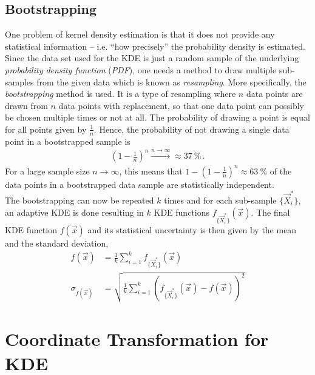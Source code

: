 \subsection{Bootstrapping}\label{sec:bootstrapping}

One problem of kernel density estimation is that it does not provide any statistical information -- i.e. \enquote{how precisely} the probability density is estimated. Since the data set used for the KDE is just a random sample of the underlying \textit{probability density function} (\textit{PDF}), one needs a method to draw multiple sub-samples from the given data which is known as \textit{resampling}. More specifically, the \textit{bootstrapping} method is used. It is a type of resampling where $n$ data points are drawn from $n$ data points with replacement, so that one data point can possibly be chosen multiple times or not at all. The probability of drawing a point is equal for all points given by $\frac{1}{n}$. Hence, the probability of not drawing a single data point in a bootstrapped sample is
\begin{align}
	\left(1-\frac{1}{n}\right)^n \overset{n\to\infty}{\longrightarrow} \approx\SI{37}{\percent}\,.
\end{align}
For a large sample size $n\to\infty$, this means that $1-\left(1-\frac{1}{n}\right)^n\approx\SI{63}{\percent}$ of the data points in a bootstrapped data sample are statistically independent.\\
\newpage
The bootstrapping can now be repeated $k$ times and for each sub-sample $\{\vec{X}_i^\ast\}$, an adaptive KDE is done resulting in $k$ KDE functions $f_{\{\vec{X}_i^\ast\}}(\vec{x})$. The final KDE function $f(\vec{x})$ and its statistical uncertainty is then given by the mean and the standard deviation,~\cite{kde:bootstrapping,kde:schoenen}
\begin{subequations}
	\begin{align}
		f(\vec{x}) &= \frac{1}{k}\sum_{i=1}^{k} f_{\{\vec{X}_i^\ast\}}(\vec{x})\\
		\sigma_{f(\vec{x})}	&= \sqrt{\frac{1}{k}\sum_{i=1}^{k}\left(f_{\{\vec{X}_i^\ast\}}(\vec{x}) - f(\vec{x})\right)^2}
	\end{align}
\end{subequations}

\section{Coordinate Transformation for KDE}

